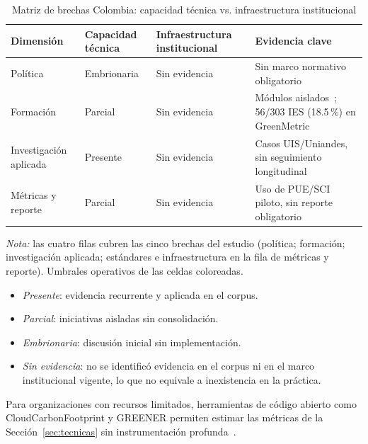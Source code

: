 \documentclass[conference]{IEEEtran}
\begin{document}
\begin{table}[H]
\caption{Matriz de brechas Colombia: capacidad t\'ecnica vs. infraestructura institucional}
\label{tab:gaps}
\centering
\footnotesize
\begin{tabular}{@{}R{1.5cm} R{1.8cm} R{1.8cm} R{2.0cm} @{}}
\toprule
\textbf{Dimensi\'on} & \textbf{Capacidad t\'ecnica} & \textbf{Infraestructura institucional} & \textbf{Evidencia clave} \\
\midrule
Pol\'itica & Embrionaria & Sin evidencia & Sin marco normativo obligatorio~\cite{bossa2023,rodriguezcorrea2023} \\
Formaci\'on & Parcial & Sin evidencia & M\'odulos aislados~\cite{castro2025,puerta2024}; 56/303 IES (18.5\,\%) en GreenMetric~\cite{greenmetric2024,observatorio2024} \\
Investigaci\'on aplicada & Presente & Sin evidencia & Casos UIS/Uniandes, sin seguimiento longitudinal~\cite{hernandez2011,diaz2013,paton2019} \\
M\'etricas y reporte & Parcial & Sin evidencia & Uso de PUE/SCI piloto, sin reporte obligatorio~\cite{fontanarrosa2024,jin2025} \\
\bottomrule
\end{tabular}
\par\vspace{4pt}
\textit{Nota:} las cuatro filas cubren las cinco brechas del estudio (pol\'itica; formaci\'on; investigaci\'on aplicada; est\'andares e infraestructura en la fila de m\'etricas y reporte). Umbrales operativos de las celdas coloreadas.
\begin{itemize}
\item \emph{Presente}: evidencia recurrente y aplicada en el corpus.
\item \emph{Parcial}: iniciativas aisladas sin consolidaci\'on.
\item \emph{Embrionaria}: discusi\'on inicial sin implementaci\'on.
\item \emph{Sin evidencia}: no se identific\'o evidencia en el corpus ni en el marco institucional vigente, lo que no equivale a inexistencia en la pr\'actica.
\end{itemize}
\end{table}

Para organizaciones con recursos limitados, herramientas de c\'odigo abierto como CloudCarbonFootprint y GREENER permiten estimar las m\'etricas de la Secci\'on~\ref{sec:tecnicas} sin instrumentaci\'on profunda~\cite{currie2024}.
\end{document}
